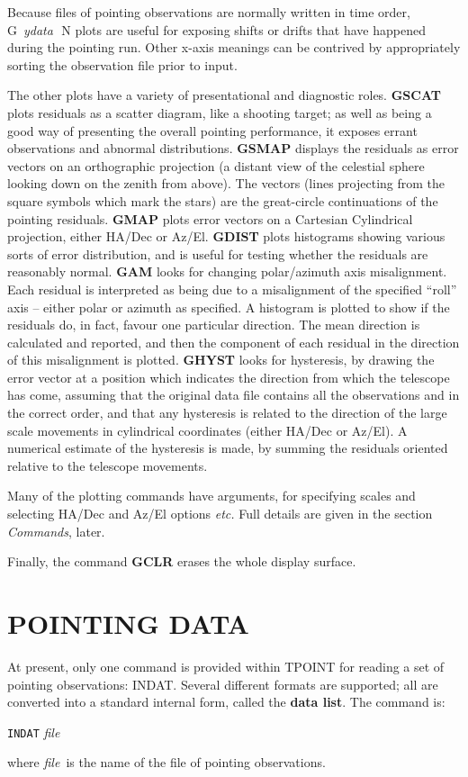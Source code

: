 Because files of pointing observations are normally written
in time order, G~{\it ydata}\,~N plots are useful for exposing shifts
or drifts that have
happened during the pointing run.  Other x-axis meanings can
be contrived by appropriately sorting the observation file prior
to input.

The other plots have a variety of presentational and diagnostic roles.
{\bf GSCAT} plots residuals as a scatter diagram, like a shooting
target;  as well as being a good way of presenting the overall pointing
performance, it exposes errant observations and abnormal
distributions.
{\bf GSMAP} displays the residuals as error vectors on an
orthographic projection (a distant view of the celestial sphere
looking down on the zenith from above).  The vectors (lines
projecting from the square symbols which mark the stars)
are the great-circle continuations of the pointing
residuals.
{\bf GMAP} plots error vectors on a Cartesian Cylindrical projection,
either HA/Dec or Az/El.
{\bf GDIST} plots histograms showing various sorts of
error distribution, and is useful for testing whether
the residuals are reasonably normal.
{\bf GAM} looks for changing polar/azimuth axis misalignment.
Each residual is interpreted as being due to a misalignment
of the specified ``roll'' axis -- either polar or azimuth
as specified.  A histogram is plotted to show if the
residuals do, in fact, favour one particular direction.
The mean direction is calculated and reported, and then the
component of each residual in the direction of this misalignment
is plotted.
{\bf GHYST} looks for hysteresis, by drawing the error vector
at a position which indicates the direction from which the
telescope has come, assuming that the original data file contains
all the observations and in the correct order, and that any
hysteresis is related to the direction of the large scale
movements in cylindrical coordinates (either HA/Dec or
Az/El).  A numerical estimate of the hysteresis is made, by
summing the residuals oriented relative to the telescope
movements.

Many of the plotting commands have arguments, for
specifying scales and selecting HA/Dec and Az/El
options {\it etc.}  Full details are given in the section
{\it Commands}, later.

Finally, the command {\bf GCLR} erases the whole display surface.

\section{POINTING DATA}
At present, only one command is provided within TPOINT for reading
a set of pointing observations: INDAT.  Several different
formats are supported; all are converted into a standard
internal form, called the {\bf data list}.  The command is:
\begin{cmnds}
\> \> {\tt INDAT} {\it file}
\end{cmnds}
where {\it file}\, is the name of the
file of pointing observations.

